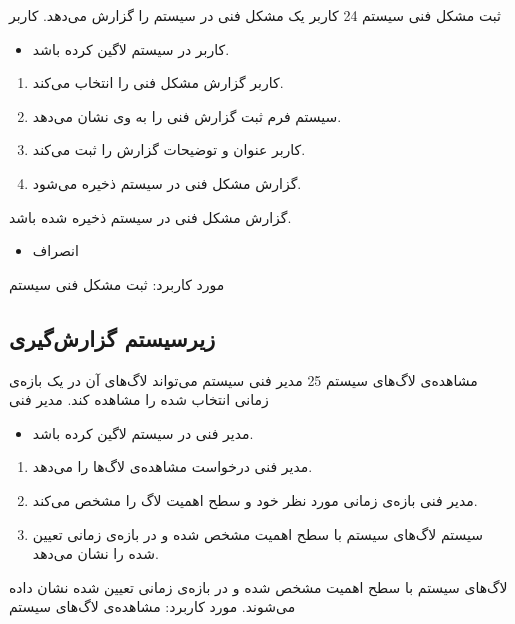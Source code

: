 {
	\usecase
	{
 ثبت مشکل فنی سیستم
	}
	{24}
	{
کاربر یک مشکل فنی در سیستم را گزارش می‌دهد.
	}
	{
کاربر
	}
	{}
	{
		\begin{itemize}
			\vspace*{-0.6cm}
			\item 
			کاربر در سیستم لاگین کرده باشد.
		\end{itemize}
	}
	{
		\begin{enumerate}
			\item
		کاربر گزارش مشکل فنی را انتخاب می‌کند.
			\item 
سیستم فرم ثبت گزارش فنی را به وی نشان می‌دهد.
			\item 
			کاربر عنوان و توضیحات گزارش را ثبت می‌کند.
			\item 
		گزارش مشکل فنی در سیستم ذخیره می‌شود.
		\end{enumerate}
	}
	{
گزارش مشکل فنی در سیستم ذخیره شده باشد.
	}
	{
		\begin{itemize}
			\vspace*{-0.6cm}
			\item 
			انصراف
		\end{itemize}
	}
	{
		مورد کاربرد: ثبت مشکل فنی سیستم
	}
	
	
	
}

\newpage
\subsection{زیرسیستم گزارش‌گیری}


{
\usecase
{
	مشاهده‌ی لاگ‌های سیستم
}
{25}
{
مدیر فنی سیستم می‌تواند لاگ‌های آن در یک بازه‌ی زمانی انتخاب شده را مشاهده کند.
}
{
	مدیر فنی
}
{}
{
	\begin{itemize}
		\vspace*{-0.6cm}
		\item 
مدیر فنی در سیستم لاگین کرده باشد.
	\end{itemize}
}
{
	\vspace*{-0.6cm}
	\begin{enumerate}
		\item 
مدیر فنی درخواست مشاهده‌ی لاگ‌ها را می‌دهد.
		\item
		مدیر فنی بازه‌ی زمانی مورد نظر خود و سطح اهمیت لاگ را مشخص می‌کند.
		\item
		سیستم لاگ‌های سیستم با سطح اهمیت مشخص شده و در بازه‌ی زمانی تعیین شده را نشان می‌دهد.		
	\end{enumerate}
}
{
لاگ‌های سیستم با سطح اهمیت مشخص شده و در بازه‌ی زمانی تعیین شده نشان داده می‌شوند.
}
{
}
{
	مورد کاربرد: مشاهده‌ی لاگ‌های سیستم
}
}

